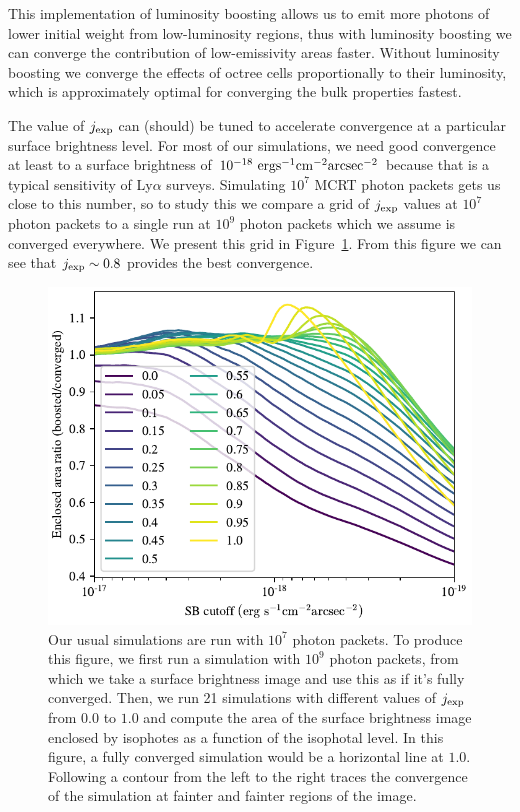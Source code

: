 This implementation of luminosity boosting allows us to emit more photons of lower initial weight from low-luminosity regions, thus with luminosity boosting we can converge the contribution of low-emissivity areas faster.
Without luminosity boosting we converge the effects of octree cells proportionally to their luminosity, which is approximately optimal for converging the bulk properties fastest.

The value of $j_{\rm exp}$ can (should) be tuned to accelerate convergence at a particular surface brightness level.
For most of our simulations, we need good convergence at least to a surface brightness of $10^{-18}\ \rm{erg}\rm{s}^{-1}\rm{cm}^{-2}\rm{arcsec}^{-2}$ because that is a typical sensitivity of Ly$\alpha$ surveys.
Simulating $10^7$ MCRT photon packets gets us close to this number, so to study this we compare a grid of $j_{\rm exp}$ values at $10^7$ photon packets to a single run at $10^9$ photon packets which we assume is converged everywhere.
We present this grid in Figure~\ref{fig:j_exp_profiles}.
From this figure we can see that $j_{\rm exp} \sim 0.8$ provides the best convergence.

\begin{figure}[H]
   \centering
   \includegraphics[width=0.9\columnwidth]{figures/profiles.pdf}
    \caption{
        Our usual simulations are run with $10^{7}$ photon packets.
        To produce this figure, we first run a simulation with $10^{9}$ photon packets, from which we take a surface brightness image and use this as if it's fully converged.
        Then, we run 21 simulations with different values of $j_{\rm exp}$ from $0.0$ to $1.0$ and compute the area of the surface brightness image enclosed by isophotes as a function of the isophotal level.
        In this figure, a fully converged simulation would be a horizontal line at $1.0$.
        Following a contour from the left to the right traces the convergence of the simulation at fainter and fainter regions of the image.
    }
   \label{fig:j_exp_profiles}
\end{figure}


